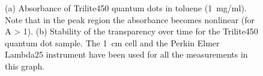 \documentclass[cits]{JINST}
\begin{document}
\begin{figure}
        \begin{center}
        \caption[]{(a) Absorbance of Trilite450 quantum dots in toluene (1~mg/ml). Note that in the peak region the absorbance becomes nonlinear (for A > 1). (b) Stability of the transparency over time for the Trilite450 quantum dot sample. The 1~cm cell and the Perkin Elmer Lambda25 instrument have been used for all the measurements in this graph. \label{trilite450_stability}}
        \end{center}
\end{figure}
\end{document}
